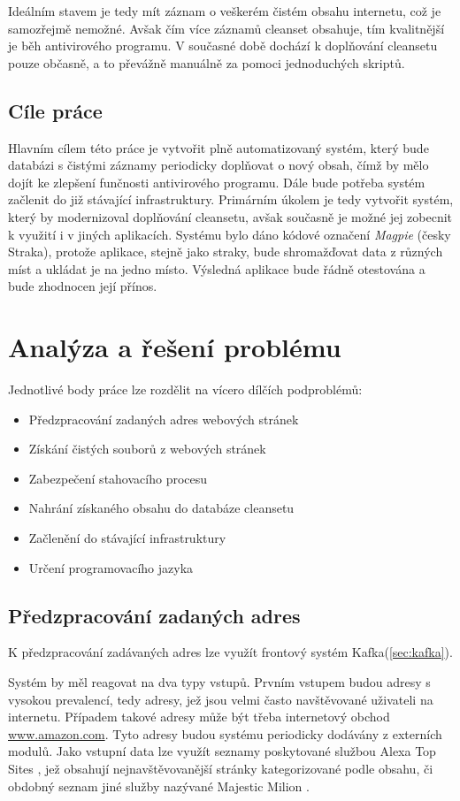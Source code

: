 \documentclass[thesis=M,czech,hidelinks]{FITthesis}[2013/05/06]
\begin{document}
Ideálním stavem je tedy mít záznam o veškerém čistém obsahu internetu, což je samozřejmě nemožné. Avšak čím více záznamů cleanset obsahuje, tím kvalitnější je běh antivirového programu. V současné době dochází k doplňování cleansetu pouze občasně, a to převážně manuálně za pomoci jednoduchých skriptů.

\section{Cíle práce} 
 Hlavním cílem této práce je vytvořit plně automatizovaný systém, který bude databázi s čistými záznamy periodicky doplňovat o nový obsah, čímž by mělo dojít ke zlepšení funčnosti antivirového programu. Dále bude potřeba systém začlenit do již stávající infrastruktury. Primárním úkolem je tedy vytvořit systém, který by modernizoval doplňování cleansetu, avšak současně je možné jej zobecnit k využití i v jiných aplikacích. Systému bylo dáno kódové označení \textit{Magpie} (česky Straka), protože aplikace, stejně jako straky, bude shromažďovat data z různých míst a ukládat je na jedno místo. Výsledná aplikace bude řádně otestována a bude zhodnocen její přínos.


\chapter{Analýza a řešení problému}
Jednotlivé body práce lze rozdělit na vícero dílčích podproblémů:

\begin{itemize}
	\item Předzpracování zadaných adres webových stránek
	\item Získání čistých souborů z webových stránek
	\item Zabezpečení stahovacího procesu
	\item Nahrání získaného obsahu do databáze cleansetu
	\item Začlenění do stávající infrastruktury
	\item Určení programovacího jazyka
\end{itemize}


\section{Předzpracování zadaných adres}
K předzpracování zadávaných adres lze využít frontový systém Kafka(\ref{sec:kafka}).

Systém by měl reagovat na dva typy vstupů. Prvním vstupem budou adresy s vysokou prevalencí, tedy adresy, jež jsou velmi často navštěvované uživateli na internetu. Případem takové adresy může být třeba internetový obchod \url{www.amazon.com}. Tyto adresy budou systému periodicky dodávány z externích modulů. Jako vstupní data lze využít seznamy poskytované službou Alexa Top Sites \cite{alexa}, jež obsahují nejnavštěvovanější stránky kategorizované podle obsahu, či obdobný seznam jiné služby nazývané Majestic Milion \cite{majestic}.
\end{document}
